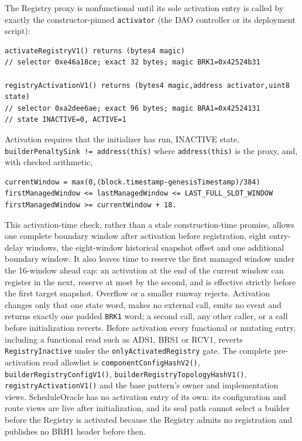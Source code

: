 \documentclass[a4paper,11pt]{article}
\newcommand{\code}[1]{\nolinkurl{#1}}
\begin{document}
The Registry proxy is nonfunctional until its sole activation entry is called
by exactly the constructor-pinned \code{activator} (the DAO controller or its
deployment script):
\begin{verbatim}
activateRegistryV1() returns (bytes4 magic)
// selector 0xe46a18ce; exact 32 bytes; magic BRK1=0x42524b31

registryActivationV1() returns (bytes4 magic,address activator,uint8 state)
// selector 0xa2dee6ae; exact 96 bytes; magic BRA1=0x42524131
// state INACTIVE=0, ACTIVE=1
\end{verbatim}
Activation requires that the initializer has run, INACTIVE state,
\code{builderPenaltySink != address(this)} where \code{address(this)} is the
proxy, and, with checked arithmetic,
\begin{verbatim}
currentWindow = max(0,(block.timestamp-genesisTimestamp)/384)
firstManagedWindow <= lastManagedWindow <= LAST_FULL_SLOT_WINDOW
firstManagedWindow >= currentWindow + 18.
\end{verbatim}
This activation-time check, rather than a stale construction-time promise,
allows one complete boundary window after activation before registration,
eight entry-delay windows, the eight-window historical snapshot offset and one
additional boundary window.  It also leaves time to reserve the first managed
window under the 16-window ahead cap: an activation at the end of the current
window can register in the next, reserve at most by the second, and is
effective strictly before the first target snapshot.  Overflow or a smaller
runway rejects.  Activation changes only that one state word, makes no
external call, emits no event and returns exactly one padded \code{BRK1} word;
a second call, any other caller, or a call before initialization reverts.
Before activation every functional or mutating entry, including a functional
read such as ADS1, BRS1 or RCV1, reverts \code{RegistryInactive} under the
\code{onlyActivatedRegistry} gate.  The complete pre-activation read allowlist
is \code{componentConfigHashV2()}, \code{builderRegistryConfigV1()},
\code{builderRegistryTopologyHashV1()}, \code{registryActivationV1()} and the
base pattern's owner and implementation views.  ScheduleOracle has no
activation entry of its own: its configuration and route views are live after
initialization, and its seal path cannot select a builder before the Registry
is activated because the Registry admits no registration and publishes no
BRH1 header before then.
\end{document}
